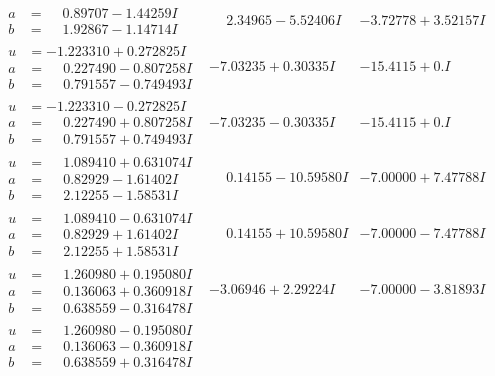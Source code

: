 \documentclass[1p]{elsarticle_modified}
\theoremstyle{definition}
\begin{document}
$$\begin{array}{c|c|c}
\begin{aligned}
a &= \phantom{-}0.89707 - 1.44259 I \\
b &= \phantom{-}1.92867 - 1.14714 I\end{aligned}
 & \phantom{-}2.34965 - 5.52406 I & -3.72778 + 3.52157 I \\ \hline\begin{aligned}
u &= -1.223310 + 0.272825 I \\
a &= \phantom{-}0.227490 - 0.807258 I \\
b &= \phantom{-}0.791557 - 0.749493 I\end{aligned}
 & -7.03235 + 0.30335 I & -15.4115 + 0. I\phantom{ +0.000000I} \\ \hline\begin{aligned}
u &= -1.223310 - 0.272825 I \\
a &= \phantom{-}0.227490 + 0.807258 I \\
b &= \phantom{-}0.791557 + 0.749493 I\end{aligned}
 & -7.03235 - 0.30335 I & -15.4115 + 0. I\phantom{ +0.000000I} \\ \hline\begin{aligned}
u &= \phantom{-}1.089410 + 0.631074 I \\
a &= \phantom{-}0.82929 - 1.61402 I \\
b &= \phantom{-}2.12255 - 1.58531 I\end{aligned}
 & \phantom{-}0.14155 - 10.59580 I & -7.00000 + 7.47788 I \\ \hline\begin{aligned}
u &= \phantom{-}1.089410 - 0.631074 I \\
a &= \phantom{-}0.82929 + 1.61402 I \\
b &= \phantom{-}2.12255 + 1.58531 I\end{aligned}
 & \phantom{-}0.14155 + 10.59580 I & -7.00000 - 7.47788 I \\ \hline\begin{aligned}
u &= \phantom{-}1.260980 + 0.195080 I \\
a &= \phantom{-}0.136063 + 0.360918 I \\
b &= \phantom{-}0.638559 - 0.316478 I\end{aligned}
 & -3.06946 + 2.29224 I & -7.00000 - 3.81893 I \\ \hline\begin{aligned}
u &= \phantom{-}1.260980 - 0.195080 I \\
a &= \phantom{-}0.136063 - 0.360918 I \\
b &= \phantom{-}0.638559 + 0.316478 I\end{aligned}

\end{array}$$
\end{document}
